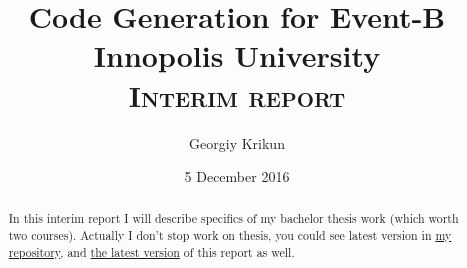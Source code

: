 \documentclass[12pt]{article}
\title{
	{Code Generation for Event-B}\\
	{\large Innopolis University}\\
	{\large \textsc{Interim report}}\\
}
\author{Georgiy Krikun}
\date{5 December 2016}
\begin{document}
\setcounter{secnumdepth}{0}

\maketitle
\pagebreak
\begin{abstract}
  In this interim report I will describe specifics of my bachelor thesis work
  (which worth two courses).
  Actually I don't stop work on thesis, you could see latest version in 
  \href{https://github.com/kriku/thesis}{my repository}, and
  \href{https://kriku.github.io/thesis/paper/thesis.pdf}{the latest version}
  of this report as well.
\end{abstract}

\pagebreak
\tableofcontents











\end{document}
